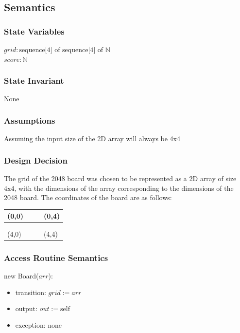 \documentclass[12pt]{article}
\begin{document}
\subsection* {Semantics}

\subsubsection* {State Variables}

$\mathit{grid}: \text{sequence[4] of sequence[4] of } \mathbb{N}$\\
$\mathit{score}: \mathbb{N}$

\subsubsection* {State Invariant}

None

\subsubsection* {Assumptions}

Assuming the input size of the 2D array will always be 4x4

\subsubsection*{Design Decision}

The grid of the 2048 board was chosen to be represented as a 2D array of size 4x4, with the dimensions of the array corresponding to the dimensions of the 2048 board. The coordinates of the board are as follows:
\begin{table}[h]
\centering
\begin{tabular}{|l|l|l|l|}
\hline
(0,0) &  &  & (0,4) \\ \hline
      &  &  &       \\ \hline
      &  &  &       \\ \hline
(4,0) &  &  & (4,4) \\ \hline
\end{tabular}
\end{table}

\subsubsection* {Access Routine Semantics}

\noindent new Board($\mathit{arr}$):
\begin{itemize}
\item transition: $\mathit{grid} := \mathit{arr}$
\item output: $out := \mbox{self}$
\item exception: none
\end{itemize}
\end{document}
